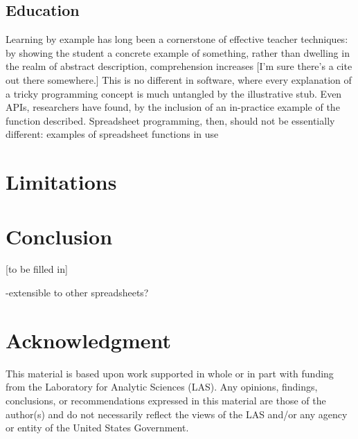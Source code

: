 \documentclass[conference]{IEEEtran}
\begin{document}
\subsection{Education}
Learning by example has long been a cornerstone of effective teacher techniques:
by showing the student a concrete example of something, rather than dwelling in
the realm of abstract description, comprehension increases [I'm sure there's a cite
out there somewhere.] This is no different in software, where every explanation of
a tricky programming concept is much untangled by the illustrative stub. Even APIs,
researchers have found, by the inclusion of an in-practice example of the function
described. Spreadsheet programming, then, should not be essentially different: 
examples of spreadsheet functions in use

\section{Limitations}

\section{Conclusion}

[to be filled in]

-extensible to other spreadsheets?


\section*{Acknowledgment}
This material is based upon work supported in whole or in part with funding from the Laboratory for Analytic Sciences (LAS). Any opinions, findings, conclusions, or recommendations expressed in this material are those of the author(s) and do not necessarily reflect the views of the LAS and/or any agency or entity of the United States Government.




%
%
%
%




\end{document}
